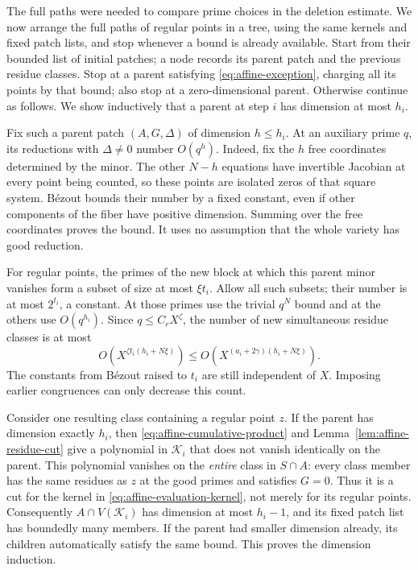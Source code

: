 The full paths were needed to compare prime choices in the deletion
estimate. We now arrange the full paths of regular points in a tree,
using the same kernels and fixed patch lists, and stop whenever a bound
is already available. Start from their bounded list of initial patches;
a node records its parent patch and the previous residue classes.
Stop at a parent satisfying
\eqref{eq:affine-exception}, charging all its points by that bound;
also stop at a zero-dimensional parent.  Otherwise continue as
follows.  We show inductively that a parent at step $i$ has dimension
at most $h_i$.

Fix such a parent patch $(A,G,\Delta)$ of dimension $h\le h_i$.
At an auxiliary prime $q$, its reductions with $\Delta\ne0$ number
$O(q^h)$.  Indeed, fix the $h$ free coordinates determined by the
minor.  The other $N-h$ equations have invertible Jacobian at every
point being counted, so these points are isolated zeros of that
square system.  B\'ezout bounds their number by a fixed constant,
even if other components of the fiber have positive dimension.
Summing over the free coordinates proves the bound.  It uses no
assumption that the whole variety has good reduction.

For regular points, the primes of the new block at which this parent
minor vanishes form a subset of size at most $\xi t_i$.  Allow all
such subsets; their number is at most $2^{t_i}$, a constant.  At those
primes use the trivial $q^N$ bound and at the others use $O(q^{h_i})$.
Since $q\le C_rX^\zeta$, the number of new simultaneous residue
classes is at most
\begin{equation}\label{eq:affine-branch-count}
 O\!\left(X^{\zeta t_i(h_i+N\xi)}\right)
 \le O\!\left(X^{(a_i+2\gamma)(h_i+N\xi)}\right).
\end{equation}
The constants from B\'ezout raised to $t_i$ are still independent of
$X$.  Imposing earlier congruences can only decrease this count.

Consider one resulting class containing a regular point $z$.  If the
parent has dimension exactly $h_i$, then
\eqref{eq:affine-cumulative-product} and
Lemma~\ref{lem:affine-residue-cut} give a polynomial in $\mathcal K_i$
that does not vanish identically on the parent.  This polynomial
vanishes on the \emph{entire} class in $S\cap A$: every class member
has the same residues as $z$ at the good primes and satisfies $G=0$.
Thus it is a cut for the kernel in
\eqref{eq:affine-evaluation-kernel}, not merely for its regular points.
Consequently $A\cap V(\mathcal K_i)$ has dimension at most $h_i-1$,
and its fixed patch list has boundedly many members. If the parent had
smaller dimension already, its children automatically satisfy the same
bound. This proves the dimension induction.

